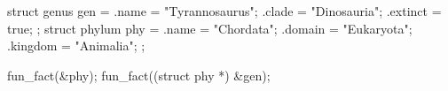 struct genus gen = {
  .name    = "Tyrannosaurus";
  .clade   = "Dinosauria"; 
  .extinct = true;
};
struct phylum phy = {
  .name    = "Chordata";
  .domain  = "Eukaryota";
  .kingdom = "Animalia";
};

fun_fact(&phy);
fun_fact((struct phy *) &gen);